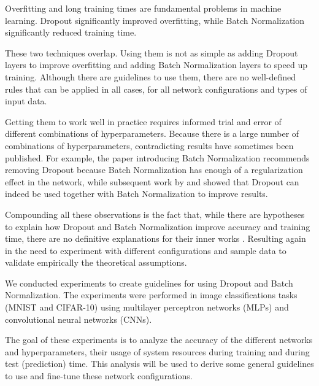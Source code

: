 \documentclass[../CAP6619_term_project_cgarbin.tex]{subfiles}
\begin{document}
Overfitting and long training times are fundamental problems in machine learning. Dropout \cite{Srivastava2014} significantly improved overfitting, while Batch Normalization \cite{Ioffe2015} significantly reduced training time.

These two techniques overlap. Using them is not as simple as adding Dropout layers to improve overfitting and adding Batch Normalization layers to speed up training. Although there are guidelines to use them, there are no well-defined rules that can be applied in all cases, for all network configurations and types of input data.

Getting them to work well in practice requires informed trial and error of different combinations of hyperparameters. Because there is a large number of combinations of hyperparameters, contradicting results have sometimes been published. For example, the paper introducing Batch Normalization \cite{Ioffe2015} recommends removing Dropout because Batch Normalization has enough of a regularization effect in the network, while subsequent work by \cite{Hendrycks2016} and \cite{Li2018} showed that Dropout can indeed be used together with Batch Normalization to improve results.

Compounding all these observations is the fact that, while there are hypotheses to explain how Dropout and Batch Normalization improve accuracy and training time, there are no definitive explanations for their inner works \cite{Nalisnick2018} \cite{Bjorck2018} \cite{Santurkar2018}. Resulting again in the need to experiment with different configurations and sample data to validate empirically the theoretical assumptions.

We conducted experiments to create guidelines for using Dropout and Batch Normalization. The experiments were performed in image classifications tasks (MNIST and CIFAR-10) using multilayer perceptron networks (MLPs) and convolutional neural networks (CNNs).

The goal of these experiments is to analyze the accuracy of the different networks and hyperparameters, their usage of system resources during training and during test (prediction) time. This analysis will be used to derive some general guidelines to use and fine-tune these network configurations.
\end{document}
